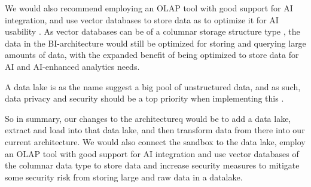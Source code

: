 We would also recommend employing an OLAP tool with good support for AI integration, 
and use vector databases to store data as to optimize it for AI usability \cite{Oracle_Vector_Database}.
As vector databases can be of a columnar storage structure type \cite{Oracle_Vector_Database}, the data in the BI-architecture would still be optimized for 
storing and querying large amounts of data,
with the expanded benefit of being optimized to store data for AI and AI-enhanced analytics needs.

A data lake is as the name suggest a big pool of unstructured data, and as such,
 data privacy and security should be a top priority when implementing this \cite{AWS_Securing_Protecting_Managing_Data}. 

So in summary, our changes to the architectureq would be to add a data lake, extract and load into that data lake, 
and then transform data from there into our current architecture.
We would also connect the sandbox to the data lake, employ an OLAP tool with good support for AI integration and 
use vector databases of the columnar data type to store data and 
increase security measures to mitigate some security risk from storing large and raw data in a datalake.

